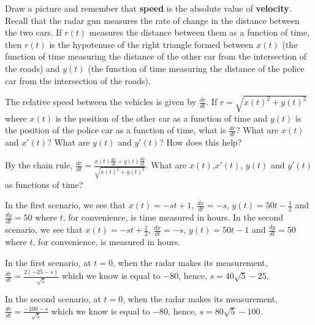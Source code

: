 \documentclass{ximera}
\begin{document}
\begin{exercise}
\begin{hint}
Draw a picture and remember that \textbf{speed} is the absolute value
of \textbf{velocity}. Recall that the radar gun measures the rate of
change in the distance between the two cars. If $r(t)$ measures the
distance between them as a function of time, then $r(t)$ is the
hypotenuse of the right triangle formed between $x(t)$ (the function
of time measuring the distance of the other car from the intersection
of the roads) and $y(t)$ (the function of time measuring the distance
of the police car from the intersection of the roads).
\end{hint}
\begin{hint}
The relative speed between the vehicles is given by
$\frac{dr}{dt}$. If $r=\sqrt{x(t)^2+y(t)^2}$ where $x(t)$ is the
position of the other car as a function of time and $y(t)$ is the
position of the police car as a function of time, what is
$\frac{dr}{dt}$? What are $x(t)$ and $x'(t)$? What are $y(t)$ and
$y'(t)$? How does this help?
\end{hint}
\begin{hint}
By the chain rule,
$\frac{dr}{dt}=\frac{x(t)\frac{dx}{dt}+y(t)\frac{dy}{dt}}{\sqrt{x(t)^2+y(t)^2}}$. What
are $x(t)$,$x'(t)$, $y(t)$ and $y'(t)$ as functions of time?
\end{hint}
\begin{hint}
In the first scenario, we see that $x(t)=-st+1$, $\frac{dx}{dt}=-s$,
$y(t)=50t-\frac{1}{2}$ and $\frac{dy}{dt}=50$ where $t$, for
convenience, is time measured in hours. In the second scenario, we see
that $x(t)=-st+\frac{1}{2}$, $\frac{dx}{dt}=-s$, $y(t)=50t-1$ and
$\frac{dy}{dt}=50$ where $t$, for convenience, is measured in hours.
\end{hint}
\begin{hint}
In the first scenario, at $t=0$, when the radar makes its measurement,
$\frac{dr}{dt}=\frac{2(-25-s)}{\sqrt{5}}$ which we know is equal to
$-80$, hence, $s=40\sqrt{5}-25$.

In the second scenario, at $t=0$, when the radar makes its
measurement, $\frac{dr}{dt}=\frac{-100-s}{\sqrt{5}}$ which we know is
equal to $-80$, hence, $s=80\sqrt{5}-100$.
\end{hint}
\end{exercise}
\end{document}
